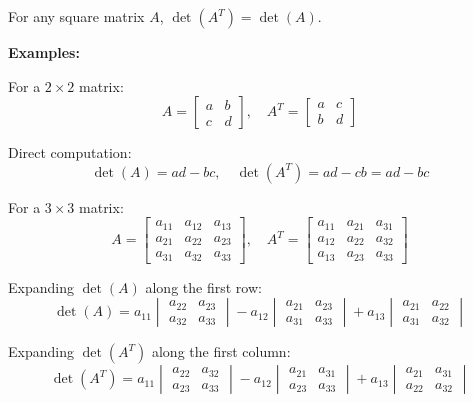 \begin{tcolorbox}[colback=blue!5!white,colframe=blue!75!black,title=Theorem]
For any square matrix $A$, $\det(A^T) = \det(A)$.
\end{tcolorbox}

\textbf{Examples:}

For a $2 \times 2$ matrix:
$$A = \begin{bmatrix} a & b \\ c & d \end{bmatrix}, \quad A^T = \begin{bmatrix} a & c \\ b & d \end{bmatrix}$$

Direct computation:
$$\det(A) = ad - bc, \quad \det(A^T) = ad - cb = ad - bc$$

For a $3 \times 3$ matrix:
$$A = \begin{bmatrix} a_{11} & a_{12} & a_{13} \\ a_{21} & a_{22} & a_{23} \\ a_{31} & a_{32} & a_{33} \end{bmatrix}, \quad A^T = \begin{bmatrix} a_{11} & a_{21} & a_{31} \\ a_{12} & a_{22} & a_{32} \\ a_{13} & a_{23} & a_{33} \end{bmatrix}$$

Expanding $\det(A)$ along the first row:
$$\det(A) = a_{11}\begin{vmatrix} a_{22} & a_{23} \\ a_{32} & a_{33} \end{vmatrix} - a_{12}\begin{vmatrix} a_{21} & a_{23} \\ a_{31} & a_{33} \end{vmatrix} + a_{13}\begin{vmatrix} a_{21} & a_{22} \\ a_{31} & a_{32} \end{vmatrix}$$

Expanding $\det(A^T)$ along the first column:
$$\det(A^T) = a_{11}\begin{vmatrix} a_{22} & a_{32} \\ a_{23} & a_{33} \end{vmatrix} - a_{12}\begin{vmatrix} a_{21} & a_{31} \\ a_{23} & a_{33} \end{vmatrix} + a_{13}\begin{vmatrix} a_{21} & a_{31} \\ a_{22} & a_{32} \end{vmatrix}$$

